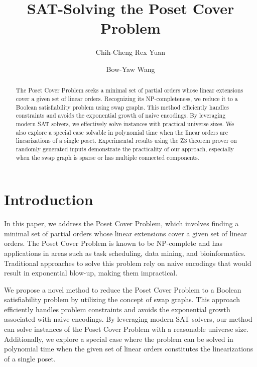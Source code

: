 \documentclass[12pt]{llncs}
\begin{document}
\title{SAT-Solving the Poset Cover Problem}

\author{Chih-Cheng Rex Yuan \and
        Bow-Yaw Wang}


\maketitle

\begin{abstract}
The Poset Cover Problem seeks a minimal set of partial orders whose linear extensions cover a given set of linear orders. Recognizing its NP-completeness, we reduce it to a Boolean satisfiability problem using swap graphs. This method efficiently handles constraints and avoids the exponential growth of naive encodings. By leveraging modern SAT solvers, we effectively solve instances with practical universe sizes. We also explore a special case solvable in polynomial time when the linear orders are linearizations of a single poset. Experimental results using the Z3 theorem prover on randomly generated inputs demonstrate the practicality of our approach, especially when the swap graph is sparse or has multiple connected components.
\end{abstract}

\section{Introduction}
In this paper, we address the Poset Cover Problem, which involves finding a minimal set of partial orders whose linear extensions cover a given set of linear orders. The Poset Cover Problem is known to be NP-complete and has applications in areas such as task scheduling, data mining, and bioinformatics. Traditional approaches to solve this problem rely on naive encodings that would result in exponential blow-up, making them impractical.

We propose a novel method to reduce the Poset Cover Problem to a Boolean satisfiability problem by utilizing the concept of swap graphs. This approach efficiently handles problem constraints and avoids the exponential growth associated with naive encodings. By leveraging modern SAT solvers, our method can solve instances of the Poset Cover Problem with a reasonable universe size. Additionally, we explore a special case where the problem can be solved in polynomial time when the given set of linear orders constitutes the linearizations of a single poset.
\end{document}
